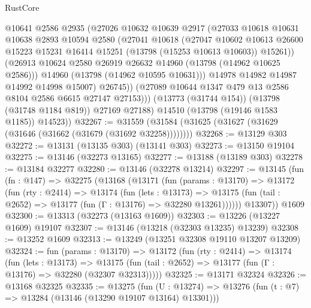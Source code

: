 \begin{lexlean}{RustCore}
\begin{coremodule}
                  @10641
                  @2586
                  @2935
                  (@27026
                    @10632
                    @10639
                    @2917
                    (@27033
                      @10618
                      @10631
                      @10638
                      @2893
                      @10594
                      @2580
                      (@27041
                        @10618
                        (@27047
                          @10602
                          @10613
                          @26600
                          @15223
                          @15231
                          @16414
                          @15251
                          (@13798 (@15253 @10613 @10603))
                          @15261))
                      (@26913 @10624 @2580 @26919 @26632 @14960 (@13798 (@14962 @10625 @2586)))
                      @14960
                      (@13798 (@14962 @10595 @10631)))
                    @14978
                    @14982
                    @14987
                    @14992
                    @14998
                    @15007)
                  @26745))
              (@27089 @10644 @1347 @479 @13 @2586 @8104 @2586 @6615 @27147 @27153)))
          (@13773 (@31744 @154))
          (@13798 (@31748 @1184 @819))
          @27169
          @27188)
        @14510
        (@13798 (@19146 @1583 @1185))
        @14523))
@32267 := @31559 (@31584 (@31625 (@31627 (@31629 (@31646 (@31662 (@31679 (@31692 @32258))))))))
@32268 := @13129 @303
@32272 := @13131 (@13135 @303) (@13141 @303)
@32273 := @13150 @19104
@32275 := @13146 (@32273 @13165)
@32277 := @13188 (@13189 @303)
@32278 := @13184 @32277
@32280 := @13146 (@32278 @13214)
@32297 := @13145
    (fun (fn : @147) =>
    @32275
      (@13168
        (@13171
          (fun (params : @13170) =>
          @13172
            (fun (rty : @2414) =>
            @13174
              (fun (lets : @13173) =>
              @13175 (fun (tail : @2652) => @13177 (fun (Γ : @13176) => @32280 @13261))))))
        @13307))
    @1609
@32300 := @13313 (@32273 (@13163 @1609))
@32303 := @13226 (@13227 @1609) @19107
@32307 := @13146 (@13218 (@32303 @13235) @13239)
@32308 := @13252 @1609
@32313 := @13249 (@13251 @32308 @19110 @13207 @13209)
@32324 := fun (params : @13170) =>
  @13172
    (fun (rty : @2414) =>
    @13174
      (fun (lets : @13173) =>
      @13175 (fun (tail : @2652) => @13177 (fun (Γ : @13176) => @32280 (@32307 @32313)))))
@32325 := @13171 @32324
@32326 := @13168 @32325
@32335 := @13275
    (fun (U : @13274) => @13276 (fun (t : @7) => @13284 (@13146 (@13290 @19107 @13164) @13301)))

\end{coremodule}
\end{lexlean}
